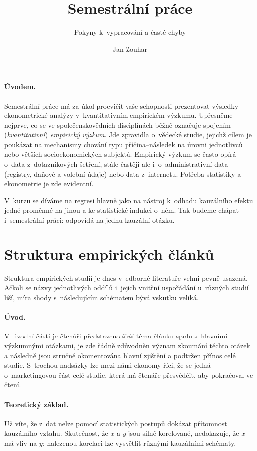 \documentclass[11pt,a4paper]{article}
\title{Semestrální práce}
\subtitle{Pokyny k~vypracování a časté chyby}
\author{Jan Zouhar}
\begin{document}
\maketitle

\paragraph{Úvodem.} Semestrální práce má za úkol procvičit vaše schopnosti prezentovat výsledky ekonometrické analýzy v~kvantitativním empirickém výzkumu. Upřesněme nejprve, co se ve společenskovědních disciplínách běžně označuje spojením (\emph{kvantitativní}) \emph{empirický výzkum}. Jde zpravidla o~vědecké studie, jejichž cílem je poukázat na mechanismy chování typu příčina--následek na úrovni jednotlivců nebo větších socioekonomických subjektů. Empirický výzkum se často opírá o~data z~dotazníkových šetření, stále častěji ale i~o~administrativní data (registry, daňové a volební údaje) nebo data z~internetu. Potřeba statistiky a ekonometrie je zde evidentní.

V~kurzu se díváme na regresi hlavně jako na nástroj k~odhadu kauzálního efektu jedné proměnné na jinou a ke statistické indukci o~něm. Tak budeme chápat i~semestrální práci: odpovídá na jednu kauzální otázku.

\section{Struktura empirických článků}
\label{sec:struktura}

Struktura empirických studií je dnes v~odborné literatuře velmi pevně usazená. Ačkoli se názvy jednotlivých oddílů i~jejich vnitřní uspořádání u~různých studií liší, míra shody s~následujícím schématem bývá vskutku veliká.

\paragraph{Úvod.} V~úvodní části je čtenáři představeno širší téma článku spolu s~hlavními výzkumnými otázkami, je zde řádně zdůvodněn význam zkoumání těchto otázek a následně jsou stručně okomentována hlavní zjištění a podtržen přínos celé studie. S~trochou nadsázky lze mezi námi ekonomy říci, že se jedná o~marketingovou část celé studie, která má čtenáře přesvědčit, aby pokračoval ve čtení.

\paragraph{Teoretický základ.} Už víte, že z~dat nelze pomocí statistických postupů dokázat přítomnost kauzálního vztahu. Skutečnost, že $x$ a $y$ jsou silně korelované, nedokazuje, že $x$ má vliv na $y$; nalezenou korelaci lze vysvětlit různými kauzálními schématy.
\end{document}

